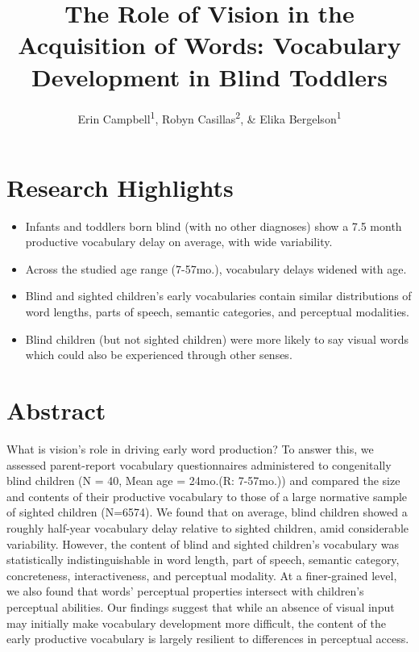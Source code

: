 \documentclass[
  man,floatsintext]{apa6}
\title{The Role of Vision in the Acquisition of Words: Vocabulary Development in Blind Toddlers}
\author{Erin Campbell\textsuperscript{1}, Robyn Casillas\textsuperscript{2}, \& Elika Bergelson\textsuperscript{1}}
\date{}
\affiliation{\vspace{0.5cm}\textsuperscript{1} Duke University\\\textsuperscript{2} Independent Researcher}
\providecommand{\tightlist}{%
  \setlength{\itemsep}{0pt}\setlength{\parskip}{0pt}}
\begin{document}
\maketitle

\hypertarget{research-highlights}{%
\section{Research Highlights}\label{research-highlights}}

\begin{itemize}
\tightlist
\item
  Infants and toddlers born blind (with no other diagnoses) show a 7.5 month productive vocabulary delay on average, with wide variability.
\item
  Across the studied age range (7-57mo.), vocabulary delays widened with age.
\item
  Blind and sighted children's early vocabularies contain similar distributions of word lengths, parts of speech, semantic categories, and perceptual modalities.
\item
  Blind children (but not sighted children) were more likely to say visual words which could also be experienced through other senses.
\end{itemize}

\hypertarget{abstract}{%
\section{Abstract}\label{abstract}}

What is vision's role in driving early word production? To answer this, we assessed parent-report vocabulary questionnaires administered to congenitally blind children (N = 40, Mean age = 24mo.(R: 7-57mo.)) and compared the size and contents of their productive vocabulary to those of a large normative sample of sighted children (N=6574). We found that on average, blind children showed a roughly half-year vocabulary delay relative to sighted children, amid considerable variability. However, the content of blind and sighted children's vocabulary was statistically indistinguishable in word length, part of speech, semantic category, concreteness, interactiveness, and perceptual modality. At a finer-grained level, we also found that words' perceptual properties intersect with children's perceptual abilities. Our findings suggest that while an absence of visual input may initially make vocabulary development more difficult, the content of the early productive vocabulary is largely resilient to differences in perceptual access.
\end{document}
